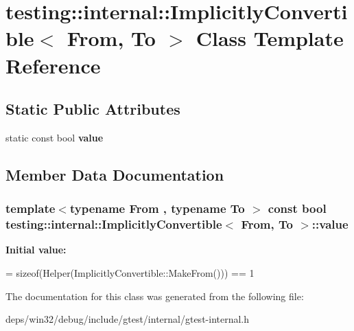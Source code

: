 \hypertarget{classtesting_1_1internal_1_1_implicitly_convertible}{}\section{testing\+:\+:internal\+:\+:Implicitly\+Convertible$<$ From, To $>$ Class Template Reference}
\label{classtesting_1_1internal_1_1_implicitly_convertible}
\subsection*{Static Public Attributes}
\begin{DoxyCompactItemize}
\item 
static const bool {\bfseries value}
\end{DoxyCompactItemize}


\subsection{Member Data Documentation}
\hypertarget{classtesting_1_1internal_1_1_implicitly_convertible_aea51cecabca681fb75659e224771b7b7}{}
\subsubsection[{value}]{\setlength{\rightskip}{0pt plus 5cm}template$<$typename From , typename To $>$ const bool {\bf testing\+::internal\+::\+Implicitly\+Convertible}$<$ From, To $>$\+::value\hspace{0.3cm}{\ttfamily [static]}}\label{classtesting_1_1internal_1_1_implicitly_convertible_aea51cecabca681fb75659e224771b7b7}
{\bfseries Initial value\+:}
\begin{DoxyCode}
=
      \textcolor{keyword}{sizeof}(Helper(ImplicitlyConvertible::MakeFrom())) == 1
\end{DoxyCode}


The documentation for this class was generated from the following file\+:\begin{DoxyCompactItemize}
\item 
deps/win32/debug/include/gtest/internal/gtest-\/internal.\+h\end{DoxyCompactItemize}
